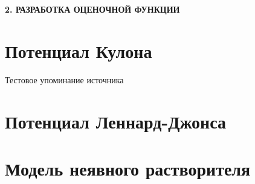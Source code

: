 \newpage
\begin{center}
	\textbf{\large 2. РАЗРАБОТКА ОЦЕНОЧНОЙ ФУНКЦИИ}
\end{center}

\section{Потенциал Кулона}

Тестовое упоминание источника \cite{666.666}

\section{Потенциал Леннард-Джонса}

\section{Модель неявного растворителя}